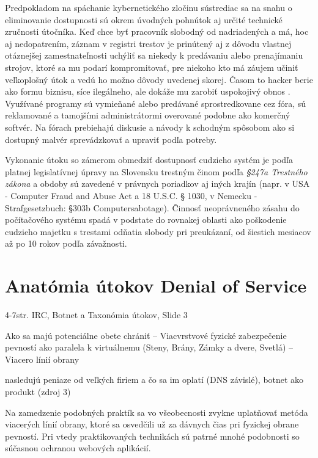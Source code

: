 \documentclass[12pt, a4paper]{article}
\begin{document}
Predpokladom na spáchanie kybernetického zločinu sústrediac sa na snahu o eliminovanie dostupnosti
sú okrem úvodných pohnútok aj určité technické zručnosti útočníka. Keď chce byť pracovník slobodný od 
nadriadených a má, hoc aj nedopatrením, záznam v registri trestov je prinútený aj z dôvodu vlastnej 
otáznejšej zamestnateľnosti uchýliť sa niekedy k predávaniu alebo prenajímaniu strojov, ktoré sa mu podarí 
kompromitovať, pre niekoho kto má záujem učiniť veľkoplošný útok a vedú ho možno dôvody uvedenej skorej.
Časom to hacker berie ako formu biznisu, síce ilegálneho, ale dokáže mu zarobiť uspokojivý obnos 
\cite{infiltrating-botnet}. Využívané programy sú vymieňané alebo predávané sprostredkovane cez fóra,
sú reklamované a tamojšími administrátormi overované podobne ako komerčný softvér. Na fórach prebiehajú
diskusie a návody k schodným spôsobom ako si dostupný malvér sprevádzkovať a upraviť podľa potreby.

Vykonanie útoku so zámerom obmedziť dostupnosť cudzieho systém je podľa platnej legislatívnej úpravy 
na Slovensku trestným činom podľa \emph{§247a Trestného zákona} a obdoby sú zavedené v právnych poriadkov aj
iných krajín (napr. v USA - Computer Fraud and Abuse Act a 18 U.S.C. § 1030, v Nemecku - Strafgesetzbuch: 
§303b  Computersabotage). Činnosť neoprávneného zásahu do počítačového systému spadá v podstate do rovnakej 
oblasti ako poškodenie cudzieho majetku s trestami odňatia slobody pri preukázaní, od šiestich mesiacov až 
po 10 rokov podľa závažnosti\cite{trestny-zakon}. 

\section{Anatómia útokov Denial of Service}



4-7str.
IRC, Botnet a Taxonómia útokov, Slide 3

Ako sa majú potenciálne obete chrániť – Viacvrstvové fyzické zabezpečenie pevností ako paralela k virtuálnemu (Steny, Brány, Zámky a dvere, Svetlá) – Viacero línií obrany


 nasledujú peniaze od veľkých firiem a čo sa im oplatí (DNS závislé), botnet ako 
produkt (zdroj 3)

Na zamedzenie 
podobných praktík sa vo všeobecnosti zvykne uplatňovať metóda viacerých línií obrany, ktoré sa osvedčili už 
za dávnych čias pri fyzickej obrane pevností. Pri vtedy praktikovaných technikách sú patrné mnohé podobnosti 
so súčasnou ochranou webových aplikácií.
\end{document}
